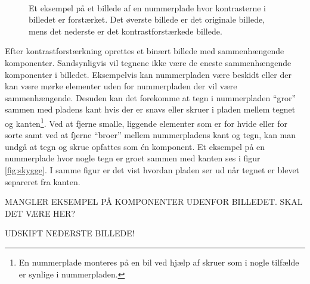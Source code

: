 \begin{figure}[htp]
  \centering
  \begin{minipage}[c]{8 cm}
    \\
  \end{minipage}
  \caption{Et eksempel på et  billede af en nummerplade hvor kontrasterne i billedet er forstærket. Det øverste billede er det originale billede, mens det nederste er det kontrastforstærkede billede.}
  \label{fig:kontrast}
\end{figure}

Efter kontrastforstærkning oprettes et binært billede med sammenhængende komponenter. Sandsynligvis vil tegnene ikke være de eneste sammenhængende komponenter i billedet. Eksempelvis kan nummerpladen være beskidt eller der kan være mørke elementer uden for nummerpladen der vil være sammenhængende. Desuden kan det forekomme at tegn i nummerpladen ``gror'' sammen med pladens kant hvis der er snavs eller skruer i pladen mellem tegnet og kanten\footnote{En nummerplade monteres på en bil ved hjælp af skruer som i nogle tilfælde er synlige i nummerpladen.}. Ved at fjerne smalle, liggende elementer som er for hvide eller for sorte samt ved at fjerne ``broer'' mellem nummerpladens kant og tegn, kan man undgå at tegn og skrue opfattes som én komponent. Et eksempel på en nummerplade hvor nogle tegn er groet sammen med kanten ses i figur \vref{fig:skygge}. I samme figur er det vist hvordan pladen ser ud når tegnet er blevet separeret fra kanten.

MANGLER EKSEMPEL PÅ KOMPONENTER UDENFOR BILLEDET. SKAL DET VÆRE HER?

UDSKIFT NEDERSTE BILLEDE!

